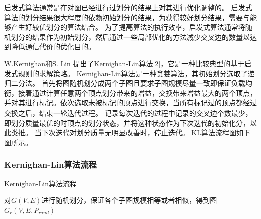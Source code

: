 启发式算法通常是在对图已经进行过划分的结果上对其进行优化调整的。
启发式算法的划分结果很大程度的依赖初始划分的结果，为获得较好划分结果，需要与能够产生好较优划分的算法结合。
为了提高算法的执行效率，启发式算法通常将随机划分的结果作为初始划分，然后通过一些局部优化的方法减少交叉边的数量以达到降低通信代价的优化目的。

W.Kernighan和S. Lin 提出了Kernighan-Lin算法[2]，它是一种比较典型的基于启发式规则的求解策略。
Kernighan-Lin算法是一种贪婪算法，其初始划分选取了递归二分法。
首先将图随机划分成两个子图且要求子图规模尽量一致即保证负载均衡，接着通过计算任意两个顶点划分带来的增益，交换带来增益最大的两个顶点，并对其进行标记。依次选取未被标记的顶点进行交换，当所有标记过的顶点都经过交换之后，结束一轮迭代过程。
记录每次迭代的过程中记录的交叉边个数最少，即划分质量最优的时顶点的划分状态，并将这种状态作为下次迭代的初始化分，以此类推。
当下次迭代对划分质量无明显改善时，停止迭代。
KL算法流程图如下图所示。

\subsubsection{Kernighan-Lin算法流程}

\begin{algorithm}[htbp]
\caption{Kernighan-Lin算法流程}
\SetAlgoLined
{}
       
对$G(V,E)$进行随机划分，保证各个子图规模相等或者相似，得到图$G_r(V,E,P_{rand})$

\end{algorithm}

